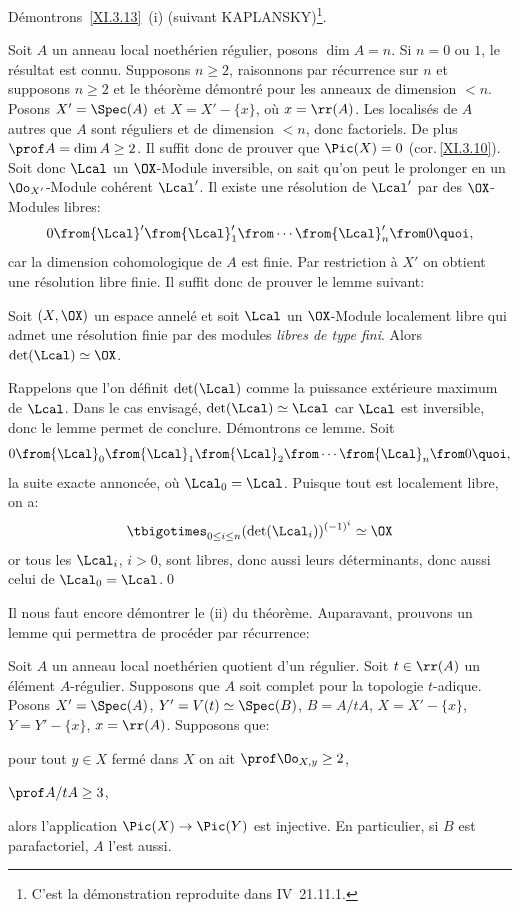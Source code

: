 D\'emontrons~\ref{XI.3.13}~(i) (suivant KAPLANSKY)\footnote{C'est la d\'emonstration reproduite dans \EGA IV~21.11.1.}.

Soit $A$ un anneau local noeth\'erien r\'egulier, posons $\dim A=n$. Si $n=0$ ou $1$, le r\'esultat est connu. Supposons $n\geq 2$, raisonnons par r\'ecurrence sur $n$ et supposons $n\geq 2$ et le th\'eor\`eme d\'emontr\'e pour les anneaux de dimension $<n$. Posons $X'=\Spec(A)$ et $X=X'-\{x\}$, o\`u $x=\rr(A)$. Les localis\'es de $A$ autres que $A$ sont r\'eguliers et de dimension $<n$, donc factoriels. De plus $\prof A = \dim A\geq 2$. Il suffit donc de prouver que $\Pic(X)=0$ (cor.\,\ref{XI.3.10}). Soit donc ${\Lcal}$ un $\OX$-Module inversible, on sait qu'on peut le prolonger en un $\Oo_{X'}$-Module coh\'erent ${\Lcal}'$. Il existe une r\'esolution de ${\Lcal}'$ par des $\OX$-Modules libres:
\[
0\from {\Lcal}'\from {\Lcal}'_1\from\cdots\from{\Lcal}'_n\from 0{\quoi},
\]
car la dimension cohomologique de $A$ est finie. Par restriction \`a $X'$ on obtient une r\'esolution libre finie. Il suffit donc de prouver le lemme suivant:

\begin{lemme} \label{XI.3.15} Soit $(X, \OX)$ un espace annel\'e et soit ${\Lcal}$ un $\OX$-Module localement libre qui admet une r\'esolution finie par des modules \emph{libres de type fini}. Alors $\det({\Lcal}) \simeq \OX$.
\end{lemme}

Rappelons que l'on d\'efinit $\det({\Lcal})$ comme la puissance ext\'erieure maximum de ${\Lcal}$. Dans le cas envisag\'e, $\det({\Lcal}) \simeq{\Lcal}$ car ${\Lcal}$ est inversible, donc le lemme permet de conclure. D\'emontrons ce lemme. Soit
\[
0\from {\Lcal}_0\from {\Lcal}_1\from {\Lcal}_2\from\cdots\from{\Lcal}_n\from 0{\quoi},
\]
la suite exacte annonc\'ee, o\`u ${\Lcal}_0={\Lcal}$. Puisque tout est localement libre, on a:
\[
\tbigotimes_{0\leq i\leq n}(\det({\Lcal}_i))^{(-1)^i} \simeq \OX
\]
or tous les ${\Lcal}_i$, $i>0$, sont libres, donc aussi leurs d\'eterminants, donc aussi celui de ${\Lcal}_0 = {\Lcal}$.\qed

\medskip
Il nous faut encore d\'emontrer le (ii) du th\'eor\`eme. Auparavant, prouvons un lemme qui permettra de proc\'eder par r\'ecurrence:

\begin{lemme} \label{XI.3.16}
Soit $A$ un anneau local noeth\'erien quotient d'un r\'egulier. Soit $t\in\rr(A)$ un \'el\'ement $A$-r\'egulier. Supposons que $A$ soit complet pour la topologie $t$-adique. Posons $X'=\Spec(A)$, $Y'=V(t)\simeq \Spec(B)$, $B=A/tA$, $X=X'-\{x\}$, $Y=Y'-\{x\}$, $x=\rr(A)$. Supposons que:
\begin{enumeratea}
\item
pour tout $y\in X$ ferm\'e dans $X$ on ait $\prof\Oo_{X, y}\geq 2$,
\item
$\prof A/tA\geq 3$,
\end{enumeratea}
\noindent
alors l'application $\Pic(X)\to\Pic(Y)$ est injective. En particulier, si $B$ est parafactoriel, $A$ l'est aussi.
\end{lemme}

